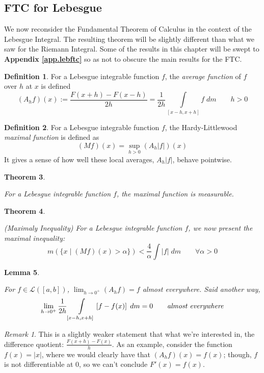 \documentclass[12pt]{article}
\theoremstyle{plain}
\newtheorem{thm}{Theorem}[subsection]
\newtheorem{lem}[thm]{Lemma}
\theoremstyle{definition}
\newtheorem{defn}[thm]{Definition}
\theoremstyle{remark}
\newtheorem*{rmk}{Remark}
\begin{document}
\newpage
\subsection{FTC for Lebesgue\label{sec.lebftc}}

We now reconsider the Fundamental Theorem of Calculus in the context of the Lebesgue Integral. The resulting theorem will be slightly different than what we saw for the Riemann Integral. Some of the results in this chapter will be swept to \textbf{Appendix \ref{app.lebftc}} so as not to obscure the main results for the FTC.

\begin{defn} 
For a Lebesgue integrable function $f$, the \emph{average function} of $f$ over $h$ at $x$ is defined
\[
    (A_h f)(x) := \frac{F(x+h)-F(x-h)}{2h} = \frac{1}{2h} \int\limits_{[x-h,x+h]} f\; dm
    \qquad h>0
\]
\end{defn}

\begin{defn}
For a Lebesgue integrable function $f$, the Hardy-Littlewood \emph{maximal function} is defined as 
\[
    (Mf)(x) = \sup_{h>0} \left(A_h|f|\right)(x)
\]
It gives a sense of how well these local averages, $A_h|f|$, behave pointwise.
\end{defn}

\begin{thm}
\hypertarget{maxmeas.thm}{}
\label{maxmeas.thm.n}
For a Lebesgue integrable function $f$, the maximal function is measurable.
\end{thm}

\begin{thm}
\hypertarget{maxineq.thm}{}
\label{maxineq.thm.n}
\emph{(Maximaly Inequality)}
For a Lebesgue integrable function $f$, we now present the \emph{maximal inequality}:
\[
    m\left(\{x \; |\;(Mf)(x)>\alpha\}\right)
    < \frac{4}{\alpha} \int |f|\; dm
    \qquad \forall \alpha>0
\]
\end{thm}

\begin{lem}
\hypertarget{avefn.lem}{}
\label{avefn.lem.n}
For $f\in\mathscr{L}([a,b])$, $\lim_{h\rightarrow0^+}(A_hf)=f$ almost everywhere. Said another way,
\[
    \lim_{h\rightarrow0^+} \frac{1}{2h} \int\limits_{[x-h,x+h]} \left[f-f(x)\right]\; dm
    = 0
    \qquad \text{\emph{almost everywhere}}
\]
\end{lem}
\begin{rmk}
This is a slightly weaker statement that what we're interested in, the difference quotient: $\frac{F(x+h)-F(x)}{h}$. As an example, consider the function $f(x)=|x|$, where we would clearly have that $(A_hf)(x)=f(x)$; though, $f$ is not differentiable at 0, so we can't conclude $F'(x)=f(x)$.
\end{rmk}
\end{document}
